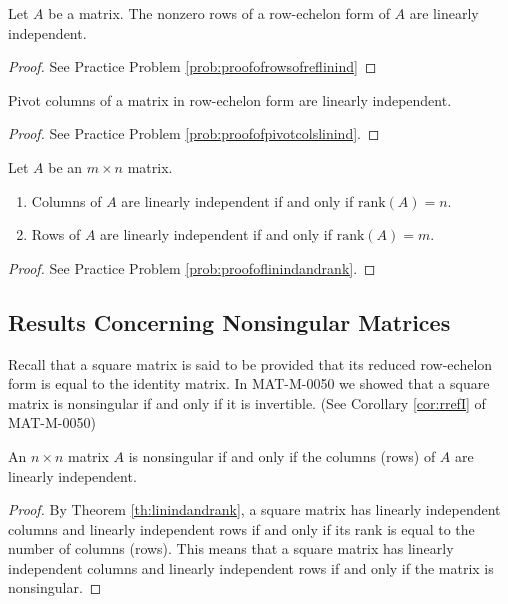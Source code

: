 \documentclass{ximera}
\begin{document}
\begin{theorem}\label{th:rowsofreflinind}
Let $A$ be a matrix.  The nonzero rows of a row-echelon form of $A$ are linearly independent.
\end{theorem}
\begin{proof}
See Practice Problem \ref{prob:proofofrowsofreflinind}
\end{proof}

\begin{theorem}\label{th:pivotcolslinind}
Pivot columns of a matrix in row-echelon form are linearly independent.
\end{theorem}
\begin{proof}
See Practice Problem \ref{prob:proofofpivotcolslinind}.
\end{proof}

\begin{theorem}\label{th:linindandrank}
Let $A$ be an $m\times n$ matrix.
\begin{enumerate}
    \item Columns of $A$ are linearly independent if and only if $\mbox{rank}(A)=n$.
    \item Rows of $A$ are linearly independent if and only if  $\mbox{rank}(A)=m$.
\end{enumerate}
\end{theorem}
\begin{proof}
See Practice Problem \ref{prob:proofoflinindandrank}. 
\end{proof}


\subsection{Results Concerning Nonsingular Matrices}
Recall that a square matrix is said to be  provided that its reduced row-echelon form is equal to the identity matrix.  In MAT-M-0050 we showed that a square matrix is nonsingular if and only if it is invertible. (See Corollary \ref{cor:rrefI} of MAT-M-0050)

\begin{theorem}\label{th:linindcolsnonsingular}
An $n\times n$ matrix $A$ is nonsingular if and only if the columns (rows) of $A$ are linearly independent.
\end{theorem}
\begin{proof}
By Theorem \ref{th:linindandrank}, a square matrix has linearly independent columns and linearly independent rows if and only if its rank is equal to the number of columns (rows).  This means that a square matrix has linearly independent columns and linearly independent rows if and only if the matrix is nonsingular.
\end{proof}
\end{document}
